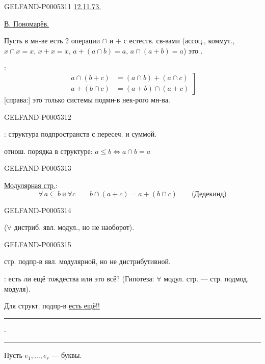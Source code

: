 \begin{GelfandAdjacentEvidence}{GELFAND-P000531}{1}
\uline{12.11.73.}\qquad{}

\uline{В. Пономарёв.}

Пусть в мн-ве есть 2 операции $\cap$ и $+$ с естеств. св-вами
(ассоц., коммут., $x\cap x=x$, $x+x=x$, $a+(a\cap b)=a$, $a\cap(a+b)=a$)
это .

:
\[
\left.\begin{aligned}
a\cap(b+c)&=(a\cap b)+(a\cap c)\\
a+(b\cap c)&=(a+b)\cap(a+c)
\end{aligned}\right]
\]
[справа:] это только системы подмн-в нек-рого мн-ва.
\end{GelfandAdjacentEvidence}
\begin{GelfandAdjacentEvidence}{GELFAND-P000531}{2}


: структура подпространств с пересеч. и суммой.

отнош. порядка в структуре: $a\le b\Longleftrightarrow a\cap b=a$
\end{GelfandAdjacentEvidence}
\begin{GelfandAdjacentEvidence}{GELFAND-P000531}{3}


\uline{Модулярная стр.}:
\[
\forall\,a\subseteq b\ \text{и}\ \forall c\qquad
b\cap(a+c)=a+(b\cap c)\qquad \text{(Дедекинд)}
\]
\end{GelfandAdjacentEvidence}
\begin{GelfandAdjacentEvidence}{GELFAND-P000531}{4}


(\sout{\mbox{$\forall$}} дистриб. явл. модул., но не наоборот).
\end{GelfandAdjacentEvidence}
\begin{GelfandAdjacentEvidence}{GELFAND-P000531}{5}


стр. подпр-в явл. модулярной, но не дистрибутивной.


: есть ли ещё тождества или это всё?
(Гипотеза: $\forall$ модул. стр. — стр. подмод. модуля).

Для структ. подпр-в \uline{есть ещё!!}

\hfill\rule{.9cm}{.35pt}\enspace\(\cdot\)\enspace\rule{1cm}{.35pt}\par

Пусть $e_1,\ldots,e_r$ — буквы.
\end{GelfandAdjacentEvidence}
